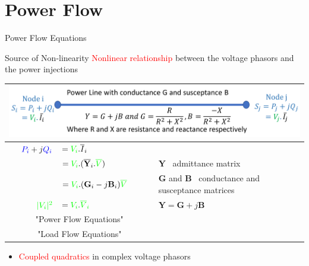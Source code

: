 \documentclass[aspectratio=169]{beamer}
\begin{document}
\section{Power Flow}
\begin{frame}{Power Flow Equations}
\vskip -0.2cm

\begin{block}{Source of Non-linearity}
\textcolor{red}{Nonlinear relationship} between the voltage phasors and the power injections
\end{block}
\vskip -0.5cm
\begin{table}[htbp!]
\begin{tabular}{|r l| l|} 
\hline
\multicolumn{3}{|c|}{ \includegraphics[scale=.15]{Figures/PowerFlow.png}}\\
\hline
 $\textcolor{blue}{P_i}+j\textcolor{blue}{Q_i} $&$= \textcolor{green}{V_i}.\overline{I}_i$& \\
 &$=\textcolor{green}{V_i}.(\mathbf{\overline{Y}}_i.\textcolor{green}{\overline{V}})$& $\mathbf{{Y}}$ \ admittance matrix\\
 &$=\textcolor{green}{V_i}. (\mathbf{G}_i-j\mathbf{B}_i)\textcolor{green}{\overline{V}}$& $\mathbf{{G}}$ and $\mathbf{{B}}$ \ conductance and susceptance matrices\\
 $\textcolor{green}{|V_i|^2}$&$=\textcolor{green}{V_i}.\textcolor{green}{\overline{V}_i}$&$\mathbf{{Y}}=\mathbf{G}+j\mathbf{B}$\\
 \multicolumn{2}{|c|}{"Power Flow Equations"}&\\
 \multicolumn{2}{|c|}{"Load Flow Equations"}&\\
 \hline
 \end{tabular}
\end{table}
\begin{itemize}[label={>}]
\item \textcolor{red}{Coupled quadratics} in complex voltage phasors
\end{itemize}
\end{frame}
\end{document}
